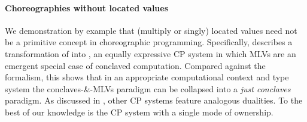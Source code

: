 \paragraph{Choreographies without located values}
We demonstration by example that (multiply or singly) located values need not be a primitive concept in choreographic programming.
Specifically,  describes a transformation of \MultiChor into \minichor,
an equally expressive CP system in which MLVs are an emergent special case of conclaved computation.
Compared against the \HLSCentral formalism, this shows that in an appropriate computational context and type system the conclaves-\&-MLVs paradigm
can be collapsed into a \emph{just conclaves} paradigm.
As discussed in , other CP systems feature analogous dualities.
To the best of our knowledge \minichor is the CP system with a single mode of ownership.

